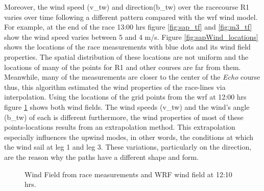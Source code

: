 Moreover, the wind speed (\acrshort{v_tw}) and direction(\acrshort{b_tw}) over the racecourse R1 varies over time following a different pattern compared with the \acrshort{wrf} wind model. For example, at the end of the race 13:00 hrs figure \ref{fig:sap_tf} and \ref{fig:m3_tf} show the wind speed varies between 5 and 4 m/s. Figure \ref{fig:sapWind_locations} shows the locations of the race measurements with blue dots and its wind field properties. The spatial distribution of these locations are not uniform and the locations of many of the points for R1 and other courses are far from them. Meanwhile, many of the measurements are closer to the center of the \textit{Echo} course thus, this algorithm estimated the wind properties of the race-lines via interpolation.%
Using the locations of the grid points from the \acrshort{wrf} at 12:00 hrs figure \ref{fig:winds_mod_comp} shows both wind fields. The wind speeds (\acrshort{v_tw}) and the wind's angle (\acrshort{b_tw}) of each is different furthermore, the wind properties of most of these points-locations results from an extrapolation method. %
This extrapolation especially influences the upwind modes, in other words, the conditions at which the wind sail at leg 1 and leg 3. These variations, particularly on the direction, are the reason why the paths have a different shape and form. \par 


\begin{figure} [hbt!]
  \centering
  \hfill
  \caption{Wind Field from race measurements and WRF wind field at 12:10 hrs.}
\label{fig:winds_mod_comp}
\end{figure}


